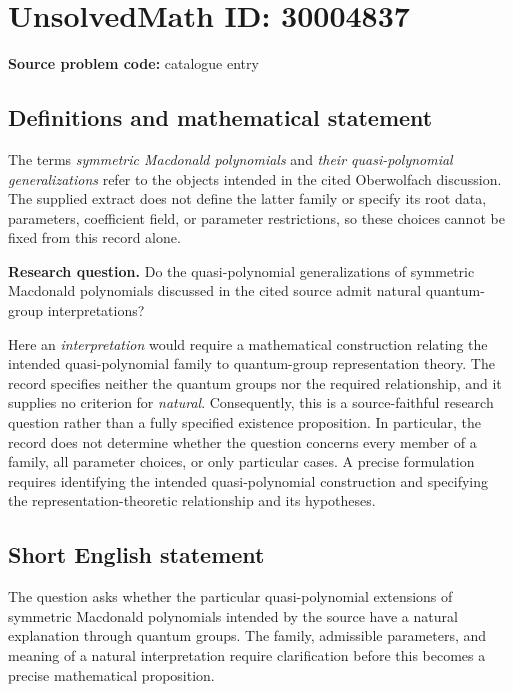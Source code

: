 \documentclass[11pt]{article}
\begin{document}
\section*{UnsolvedMath ID: 30004837}
\textbf{Source problem code:} catalogue entry
\subsection{Definitions and mathematical statement}
The terms \emph{symmetric Macdonald polynomials} and \emph{their quasi-polynomial generalizations} refer to the objects intended in the cited Oberwolfach discussion. The supplied extract does not define the latter family or specify its root data, parameters, coefficient field, or parameter restrictions, so these choices cannot be fixed from this record alone.

\textbf{Research question.} Do the quasi-polynomial generalizations of symmetric Macdonald polynomials discussed in the cited source admit natural quantum-group interpretations?

Here an \emph{interpretation} would require a mathematical construction relating the intended quasi-polynomial family to quantum-group representation theory. The record specifies neither the quantum groups nor the required relationship, and it supplies no criterion for \emph{natural}. Consequently, this is a source-faithful research question rather than a fully specified existence proposition. In particular, the record does not determine whether the question concerns every member of a family, all parameter choices, or only particular cases. A precise formulation requires identifying the intended quasi-polynomial construction and specifying the representation-theoretic relationship and its hypotheses.
\subsection{Short English statement}
The question asks whether the particular quasi-polynomial extensions of symmetric Macdonald polynomials intended by the source have a natural explanation through quantum groups. The family, admissible parameters, and meaning of a natural interpretation require clarification before this becomes a precise mathematical proposition.
\end{document}
